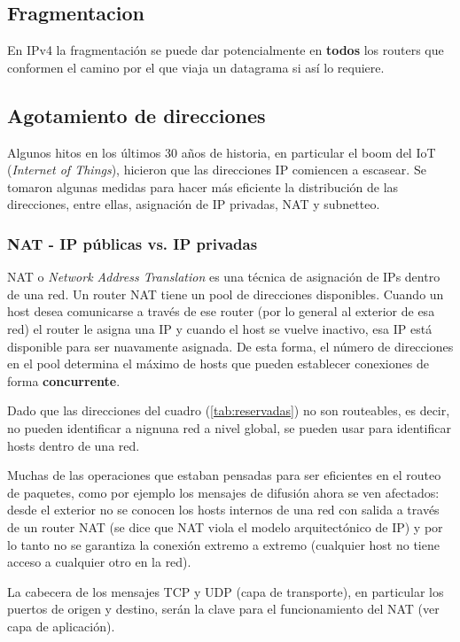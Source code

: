 \documentclass{book}
\begin{document}
	\subsection{Fragmentacion}
	En IPv4 la fragmentación se puede dar potencialmente en \textbf{todos} los routers que conformen el camino por el que viaja un datagrama si así lo requiere.
	
	\subsection{Agotamiento de direcciones}
	Algunos hitos en los últimos 30 años de historia, en particular el boom del IoT (\textit{Internet of Things}), hicieron que las direcciones IP comiencen a escasear. Se tomaron algunas medidas para hacer más eficiente la distribución de las direcciones, entre ellas, asignación de IP privadas, NAT y subnetteo.
	
	\subsubsection{NAT - IP públicas vs. IP privadas}
	NAT o \textit{Network Address Translation} es una técnica de asignación de IPs dentro de una red. Un router NAT tiene un pool de direcciones disponibles. Cuando un host desea comunicarse a través de ese router (por lo general al exterior de esa red) el router le asigna una IP y cuando el host se vuelve inactivo, esa IP está disponible para ser nuavamente asignada. De esta forma, el número de direcciones en el pool determina el máximo de hosts que pueden establecer conexiones de forma \textbf{concurrente}.
	
	\vspace{3mm}
	Dado que las direcciones del cuadro (\ref{tab:reservadas}) no son routeables, es decir, no pueden identificar a nignuna red a nivel global, se pueden usar para identificar hosts dentro de una red.
	
	\vspace{3mm}
	Muchas de las operaciones que estaban pensadas para ser eficientes en el routeo de paquetes, como por ejemplo los mensajes de difusión ahora se ven afectados: desde el exterior no se conocen los hosts internos de una red con salida a través de un router NAT (se dice que NAT viola el modelo arquitectónico de IP) y por lo tanto no se garantiza la conexión extremo a extremo (cualquier host no tiene acceso a cualquier otro en la red).
	
	\vspace{3mm}
	La cabecera de los mensajes TCP y UDP (capa de transporte), en particular los puertos de origen y destino, serán la clave para el funcionamiento del NAT (ver capa de aplicación).
	
\end{document}
